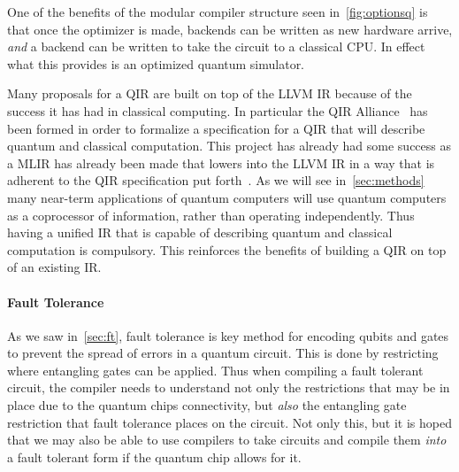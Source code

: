 One of the benefits of the modular compiler structure seen in~\cref{fig:optionsq} is that once the optimizer is made, backends can be written as new hardware arrive, \emph{and} a backend can be written to take the circuit to a classical \ac{CPU}.
In effect what this provides is an optimized quantum simulator.

Many proposals for a \ac{QIR} are built on top of the LLVM \ac{IR} because of the success it has had in classical computing.
In particular the QIR Alliance~\cite{qir} has been formed in order to formalize a specification for a \ac{QIR} that will describe quantum and classical computation.
This project has already had some success as a \ac{MLIR} has already been made that lowers into the LLVM \ac{IR} in a way that is adherent to the \ac{QIR} specification put forth~\cite{mlirquantum}.
As we will see in~\cref{sec:methods} many near-term applications of quantum computers will use quantum computers as a coprocessor of information, rather than operating independently.
Thus having a unified \ac{IR} that is capable of describing quantum and classical computation is compulsory.
This reinforces the benefits of building a \ac{QIR} on top of an existing \ac{IR}.


\paragraph{Fault Tolerance} %
As we saw in~\cref{sec:ft}, fault tolerance is key method for encoding qubits and gates to prevent the spread of errors in a quantum circuit.
This is done by restricting where entangling gates can be applied.
Thus when compiling a fault tolerant circuit, the compiler needs to understand not only the restrictions that may be in place due to the quantum chips connectivity, but \emph{also} the entangling gate restriction that fault tolerance places on the circuit.
Not only this, but it is hoped that we may also be able to use compilers to take circuits and compile them \emph{into} a fault tolerant form if the quantum chip allows for it.

